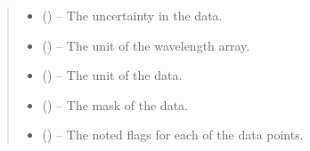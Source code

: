 \documentclass[letterpaper,11pt,english]{sphinxmanual}
\begin{document}
\begin{savenotes}
\begin{fulllineitems}
\begin{quote}
\begin{description}
\begin{itemize}
\item {} 
\sphinxAtStartPar
{} () – The uncertainty in the data.

\item {} 
\sphinxAtStartPar
{} () – The unit of the wavelength array.

\item {} 
\sphinxAtStartPar
{} () – The unit of the data.

\item {} 
\sphinxAtStartPar
{} () – The mask of the data.

\item {} 
\sphinxAtStartPar
{} () – The noted flags for each of the data points.

\end{itemize}


\end{description}\end{quote}

\end{fulllineitems}\end{savenotes}

\end{document}
